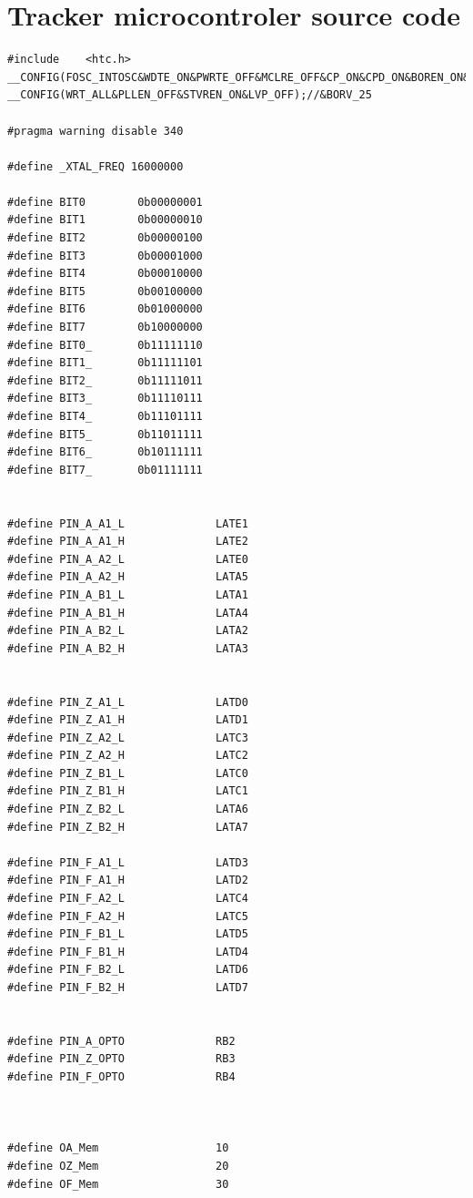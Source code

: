 \documentclass[
  a4paper,
  twoside,
  titlepage,
  11pt]{article}
\numberwithin{equation}{section}
\numberwithin{figure}{section}
\numberwithin{table}{section}
\begin{document}
\hypertarget{tracker-microcontroler-source-code}{%
\section{Tracker microcontroler source code}\label{tracker-microcontroler-source-code}}

\tiny

\begin{verbatim}
#include    <htc.h>
__CONFIG(FOSC_INTOSC&WDTE_ON&PWRTE_OFF&MCLRE_OFF&CP_ON&CPD_ON&BOREN_ON&CLKOUTEN_OFF&IESO_OFF&FCMEN_OFF);
__CONFIG(WRT_ALL&PLLEN_OFF&STVREN_ON&LVP_OFF);//&BORV_25

#pragma warning disable 340

#define _XTAL_FREQ 16000000

#define BIT0        0b00000001
#define BIT1        0b00000010
#define BIT2        0b00000100 
#define BIT3        0b00001000
#define BIT4        0b00010000
#define BIT5        0b00100000
#define BIT6        0b01000000
#define BIT7        0b10000000
#define BIT0_       0b11111110
#define BIT1_       0b11111101
#define BIT2_       0b11111011
#define BIT3_       0b11110111
#define BIT4_       0b11101111
#define BIT5_       0b11011111
#define BIT6_       0b10111111
#define BIT7_       0b01111111


#define PIN_A_A1_L              LATE1
#define PIN_A_A1_H              LATE2
#define PIN_A_A2_L              LATE0
#define PIN_A_A2_H              LATA5
#define PIN_A_B1_L              LATA1
#define PIN_A_B1_H              LATA4
#define PIN_A_B2_L              LATA2
#define PIN_A_B2_H              LATA3


#define PIN_Z_A1_L              LATD0
#define PIN_Z_A1_H              LATD1
#define PIN_Z_A2_L              LATC3
#define PIN_Z_A2_H              LATC2
#define PIN_Z_B1_L              LATC0
#define PIN_Z_B1_H              LATC1
#define PIN_Z_B2_L              LATA6
#define PIN_Z_B2_H              LATA7

#define PIN_F_A1_L              LATD3
#define PIN_F_A1_H              LATD2
#define PIN_F_A2_L              LATC4
#define PIN_F_A2_H              LATC5
#define PIN_F_B1_L              LATD5
#define PIN_F_B1_H              LATD4
#define PIN_F_B2_L              LATD6
#define PIN_F_B2_H              LATD7


#define PIN_A_OPTO              RB2
#define PIN_Z_OPTO              RB3
#define PIN_F_OPTO              RB4



#define OA_Mem                  10
#define OZ_Mem                  20
#define OF_Mem                  30


\end{verbatim}
\end{document}
